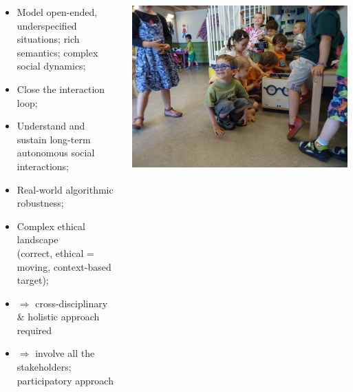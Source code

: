 \documentclass[xcolor=table,aspectratio=169]{beamer}
\begin{document}
\begin{frame}
\begin{columns}
\begin{column}{0.7\linewidth}
{                \begin{itemize}
                    \item<2-> Model open-ended, underspecified situations; rich
                        semantics; complex social dynamics;
                    \item<3-> Close the interaction loop;
                    \item<4-> Understand and sustain long-term autonomous social interactions;
                    \item<5-> Real-world algorithmic robustness;
                    \item<6-> Complex ethical landscape \\ (correct, ethical =
                        moving, context-based target);
                    \item<7-> $\Rightarrow$ cross-disciplinary \& holistic approach required
                    \item<7-> $\Rightarrow$ involve all the stakeholders;
                        participatory approach

                \end{itemize}




            }
        \end{column}
        \begin{column}{0.35\linewidth}
            \begin{center}
                \includegraphics[trim=15cm 0 11cm 0,clip,width=0.7\linewidth]{ranger/ranger_funny_glasses}
            \end{center}
        \end{column}
    \end{columns}

\end{frame}
\end{document}
